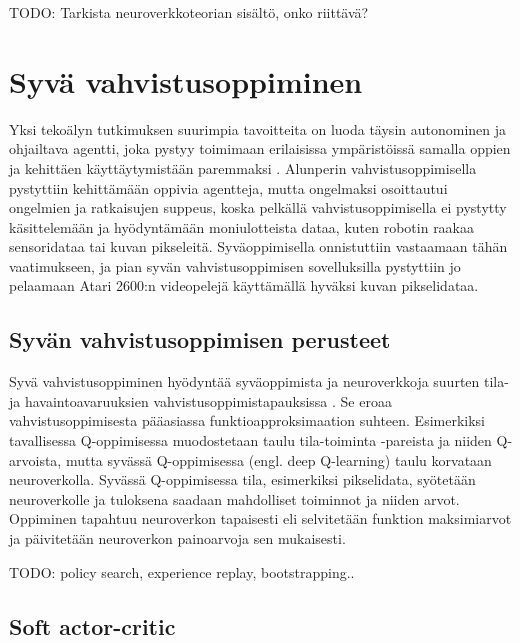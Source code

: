 \documentclass[utf8]{gradu3}
\begin{document}
TODO: Tarkista neuroverkkoteorian sisältö, onko riittävä?

\section{Syvä vahvistusoppiminen}

Yksi tekoälyn tutkimuksen suurimpia tavoitteita on luoda täysin autonominen ja ohjailtava agentti, joka pystyy toimimaan erilaisissa ympäristöissä samalla oppien ja kehittäen käyttäytymistään paremmaksi \parencite{arulkumaran2017brief}. Alunperin vahvistusoppimisella pystyttiin kehittämään oppivia agentteja, mutta ongelmaksi osoittautui ongelmien ja ratkaisujen suppeus, koska pelkällä vahvistusoppimisella ei pystytty käsittelemään ja hyödyntämään moniulotteista dataa, kuten robotin raakaa sensoridataa tai kuvan pikseleitä. Syväoppimisella onnistuttiin vastaamaan tähän vaatimukseen, ja pian syvän vahvistusoppimisen sovelluksilla pystyttiin jo pelaamaan Atari 2600:n videopelejä käyttämällä hyväksi kuvan pikselidataa.

\subsection{Syvän vahvistusoppimisen perusteet}

Syvä vahvistusoppiminen hyödyntää syväoppimista ja neuroverkkoja suurten tila- ja havaintoavaruuksien vahvistusoppimistapauksissa \parencite{li2018deep}. Se eroaa vahvistusoppimisesta pääasiassa funktioapproksimaation suhteen. Esimerkiksi tavallisessa Q-oppimisessa muodostetaan taulu tila-toiminta -pareista ja niiden Q-arvoista, mutta syvässä Q-oppimisessa (engl. deep Q-learning) taulu korvataan neuroverkolla. Syvässä Q-oppimisessa tila, esimerkiksi pikselidata, syötetään neuroverkolle ja tuloksena saadaan mahdolliset toiminnot ja niiden arvot. Oppiminen tapahtuu neuroverkon tapaisesti eli selvitetään funktion maksimiarvot ja päivitetään neuroverkon painoarvoja sen mukaisesti.

TODO: policy search, experience replay, bootstrapping..

\subsection{Soft actor-critic}
\end{document}
